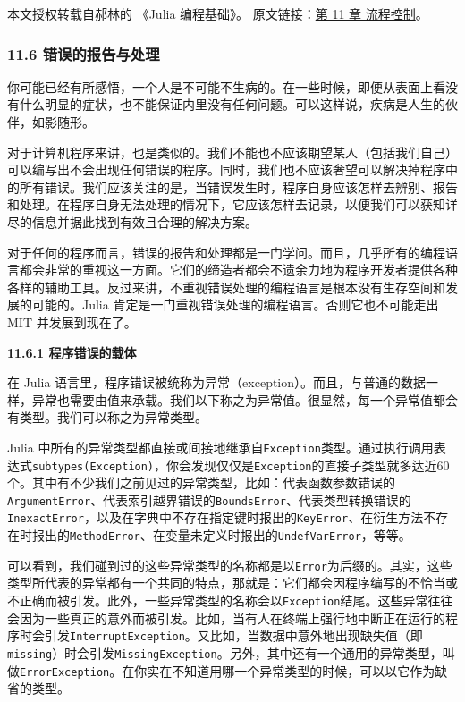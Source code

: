 
本文授权转载自郝林的 《Julia 编程基础》。 原文链接：\href{https://github.com/hyper0x/JuliaBasics/blob/master/book/ch11.md}{第 11 章 流程控制}。


\subsubsection{11.6 错误的报告与处理}

你可能已经有所感悟，一个人是不可能不生病的。在一些时候，即便从表面上看没有什么明显的症状，也不能保证内里没有任何问题。可以这样说，疾病是人生的伙伴，如影随形。

对于计算机程序来讲，也是类似的。我们不能也不应该期望某人（包括我们自己）可以编写出不会出现任何错误的程序。同时，我们也不应该奢望可以解决掉程序中的所有错误。我们应该关注的是，当错误发生时，程序自身应该怎样去辨别、报告和处理。在程序自身无法处理的情况下，它应该怎样去记录，以便我们可以获知详尽的信息并据此找到有效且合理的解决方案。

对于任何的程序而言，错误的报告和处理都是一门学问。而且，几乎所有的编程语言都会非常的重视这一方面。它们的缔造者都会不遗余力地为程序开发者提供各种各样的辅助工具。反过来讲，不重视错误处理的编程语言是根本没有生存空间和发展的可能的。Julia 肯定是一门重视错误处理的编程语言。否则它也不可能走出 MIT 并发展到现在了。

\textbf{11.6.1 程序错误的载体}

在 Julia 语言里，程序错误被统称为异常（exception）。而且，与普通的数据一样，异常也需要由值来承载。我们以下称之为异常值。很显然，每一个异常值都会有类型。我们可以称之为异常类型。

Julia 中所有的异常类型都直接或间接地继承自\verb`Exception`类型。通过执行调用表达式\verb`subtypes(Exception)`，你会发现仅仅是\verb`Exception`的直接子类型就多达近60个。其中有不少我们之前见过的异常类型，比如：代表函数参数错误的\verb`ArgumentError`、代表索引越界错误的\verb`BoundsError`、代表类型转换错误的\verb`InexactError`，以及在字典中不存在指定键时报出的\verb`KeyError`、在衍生方法不存在时报出的\verb`MethodError`、在变量未定义时报出的\verb`UndefVarError`，等等。

可以看到，我们碰到过的这些异常类型的名称都是以\verb`Error`为后缀的。其实，这些类型所代表的异常都有一个共同的特点，那就是：它们都会因程序编写的不恰当或不正确而被引发。此外，一些异常类型的名称会以\verb`Exception`结尾。这些异常往往会因为一些真正的意外而被引发。比如，当有人在终端上强行地中断正在运行的程序时会引发\verb`InterruptException`。又比如，当数据中意外地出现缺失值（即\verb`missing`）时会引发\verb`MissingException`。另外，其中还有一个通用的异常类型，叫做\verb`ErrorException`。在你实在不知道用哪一个异常类型的时候，可以以它作为缺省的类型。

